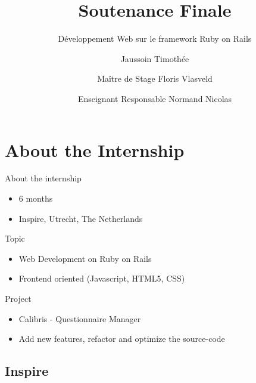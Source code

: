 \documentclass[10pt,a4paper]{beamer}
\subtitle{Développement Web sur le framework Ruby on Rails}
\title{Soutenance Finale}
\author{Jaussoin Timothée \\ \and Maître de Stage Floris Vlasveld \\ \and Enseignant Responsable Normand Nicolas}
\institute{Polytech Nantes - Département Informatique}
\begin{document}
\begin{frame}
  \titlepage
\end{frame}

\section{About the Internship}

\begin{frame}{About the internship}
  \begin{itemize}
    \item 6 months
    \item Inspire, Utrecht, The Netherlands
  \end{itemize}
  
  \begin{block}{Topic}
    \begin{itemize}
      \item Web Development on Ruby on Rails
      \item Frontend oriented (Javascript, HTML5, CSS)
    \end{itemize}
  \end{block}

  \begin{block}{Project}
    \begin{itemize}
      \item Calibris - Questionnaire Manager
      \item Add new features, refactor and optimize the source-code
    \end{itemize}
  \end{block}
\end{frame}

\subsection{Inspire}
\end{document}
